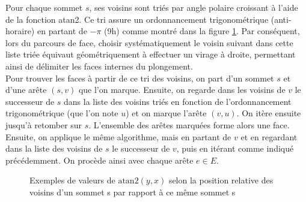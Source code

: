 \documentclass{article}
\begin{document}
Pour chaque sommet $s$, ses voisins sont triés par angle polaire croissant à l'aide de la fonction atan2. Ce tri assure un ordonnancement trigonométrique (anti-horaire) en partant de $-\pi$ (9h) comme montré dans la figure \ref{atan2}. Par conséquent, lors du parcours de face, choisir systématiquement le voisin suivant dans cette liste triée équivaut géométriquement à effectuer un virage à droite, permettant ainsi de délimiter les faces internes du plongement. \\
Pour trouver les faces à partir de ce tri des voisins, on part d'un sommet $s$ et d'une arête $(s,v)$ que l'on marque. Ensuite, on regarde dans les voisins de $v$ le successeur de $s$  dans la liste des voisins triés en fonction de l'ordonnancement trigonométrique (que l'on note $u$) et on marque l'arête $(v,u)$. On itère ensuite jusqu'à retomber sur $s$. L'ensemble des arêtes marquées forme alors une face. Ensuite, on applique le même algorithme, mais en partant de $v$ et en regardant dans la liste des voisins de $s$ le successeur de $v$, puis en itérant comme indiqué précédemment. On procède ainsi avec chaque arête $e \in E$.

\begin{figure}[h]
\centering
{}
\caption{Exemples de valeurs de $\mathrm{atan2}(y,x)$ selon la position relative des voisins d'un sommet s par rapport à ce même sommet s}
\label{atan2}
\end{figure}
\end{document}
